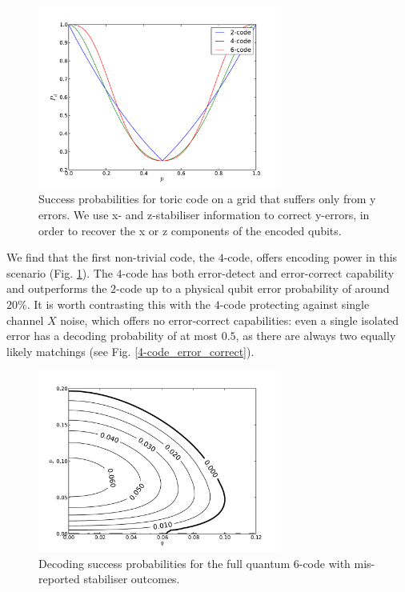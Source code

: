\begin{figure}[htb]
  \begin{center}
    \includegraphics[width=8cm]{assets/y_truthful.pdf}
  \end{center}
  \caption{Success probabilities for toric code on a grid that suffers only from y errors. We use x- and  z-stabiliser information to correct y-errors, in order to recover the x or z components of the encoded qubits.}
  \label{y_truthful}
\end{figure}

We find that the first non-trivial code, the $4$-code, offers encoding power in this scenario (Fig. \ref{y_truthful}). The $4$-code has both error-detect and error-correct capability and outperforms the $2$-code up to a physical qubit error probability of around $20\%$. It is worth contrasting this with the $4$-code protecting against single channel $X$ noise, which offers no error-correct capabilities: even a single isolated error has a decoding probability of at most $0.5$, as there are always two equally likely matchings (see Fig. \ref{4-code_error_correct}).

\begin{figure}[htb]
  \begin{center}
    \includegraphics[width=8cm]{assets/y_lying.pdf}
  \end{center}
  \caption{Decoding success probabilities for the full quantum $6$-code with mis-reported stabiliser outcomes.}
  \label{y_lying}
\end{figure}

